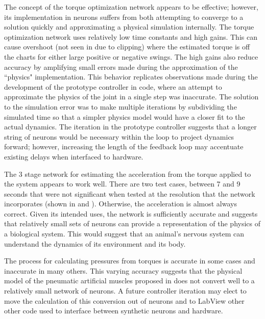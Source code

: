 The concept of the torque optimization network appears to be effective; however,
its implementation in neurons suffers from both attempting to converge to a
solution quickly and approximating a physical simulation internally. The torque optimization network
uses relatively low time constants and high gains. This can cause overshoot
(not seen in  due to clipping) where the
estimated torque is off the charts for either large positive or negative swings.
The high gains also reduce accuracy by amplifying small errors made during the
approximation of the ``physics" implementation. This behavior replicates
observations made during the development of the prototype controller in code,
where an attempt to approximate the physics of the joint in a single step was
inaccurate. The solution to the simulation error was to make multiple iterations by subdividing
the simulated time so that a simpler physics model would have a closer fit to
the actual dynamics. The iteration in the prototype controller suggests that a longer string of neurons would be
necessary within the loop to project dynamics forward; however, increasing the length of the feedback loop may accentuate existing delays when interfaced to hardware.


The 3 stage network for estimating the acceleration from the torque applied to
the system appears to work well. There are two test cases, between 7 and 9
seconds that were not significant when tested at the resolution that the
network incorporates (shown in  and ). Otherwise, the acceleration is almost always correct.
Given its intended uses, the network is sufficiently accurate and suggests that
relatively small sets of neurons can provide a representation of the physics of
a biological system. This would suggest that an animal's nervous system can understand the dynamics of its environment and its body.


The process for calculating pressures from torques is accurate in some
cases and inaccurate in many others. This varying accuracy suggests that the physical
model of the pneumatic artificial muscles proposed in \cite{HuntPMuscles}
does not convert well to a relatively small network of neurons. A future controller iteration may elect to move the
calculation of this conversion out of neurons and
to LabView other other code used to interface between synthetic neurons and
hardware.


